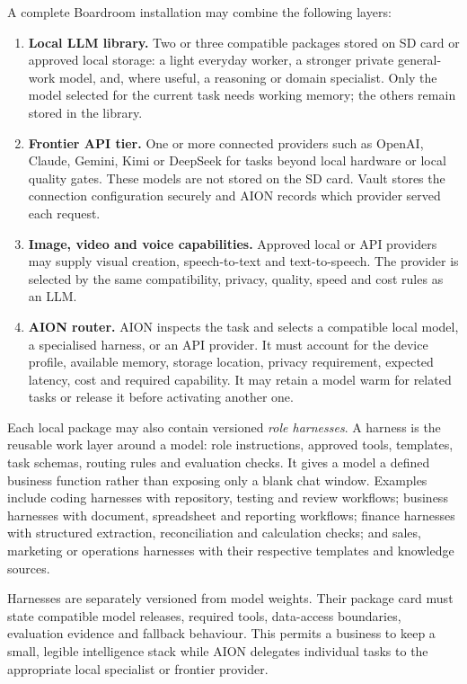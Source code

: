 A complete Boardroom installation may combine the following layers:
\begin{enumerate}
  \item \textbf{Local LLM library.}  Two or three compatible packages stored
  on SD card or approved local storage: a light everyday worker, a stronger
  private general-work model, and, where useful, a reasoning or domain
  specialist.  Only the model selected for the current task needs working
  memory; the others remain stored in the library.
  \item \textbf{Frontier API tier.}  One or more connected providers such as
  OpenAI, Claude, Gemini, Kimi or DeepSeek for tasks beyond local hardware or
  local quality gates.  These models are not stored on the SD card.  Vault
  stores the connection configuration securely and AION records which provider
  served each request.
  \item \textbf{Image, video and voice capabilities.}  Approved local or API
  providers may supply visual creation, speech-to-text and text-to-speech.  The
  provider is selected by the same compatibility, privacy, quality, speed and
  cost rules as an LLM.
  \item \textbf{AION router.}  AION inspects the task and selects a compatible
  local model, a specialised harness, or an API provider.  It must account for
  the device profile, available memory, storage location, privacy requirement,
  expected latency, cost and required capability.  It may retain a model warm
  for related tasks or release it before activating another one.
\end{enumerate}

Each local package may also contain versioned \emph{role harnesses}.  A harness
is the reusable work layer around a model: role instructions, approved tools,
templates, task schemas, routing rules and evaluation checks.  It gives a
model a defined business function rather than exposing only a blank chat
window.  Examples include coding harnesses with repository, testing and review
workflows; business harnesses with document, spreadsheet and reporting
workflows; finance harnesses with structured extraction, reconciliation and
calculation checks; and sales, marketing or operations harnesses with their
respective templates and knowledge sources.

Harnesses are separately versioned from model weights.  Their package card
must state compatible model releases, required tools, data-access boundaries,
evaluation evidence and fallback behaviour.  This permits a business to keep a
small, legible intelligence stack while AION delegates individual tasks to the
appropriate local specialist or frontier provider.

